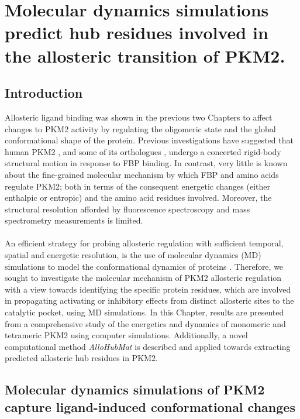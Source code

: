 \chapter{Molecular dynamics simulations predict hub residues involved in the allosteric transition of PKM2.}
\label{chapter:md}

\section{Introduction}
%
%
Allosteric ligand binding was shown in the previous two Chapters to affect changes to PKM2 activity by regulating the oligomeric state and the global conformational shape of the protein. Previous investigations have suggested that human PKM2 \cite{Morgan:2013aa}, and some of its orthologues \cite{Morgan:2010aa,Zhong:2017aa,Donovan:2016aa}, undergo a concerted rigid-body structural motion in response to FBP binding. In contrast, very little is known about the fine-grained molecular mechanism by which FBP and amino acids regulate PKM2; both in terms of the consequent energetic changes (either enthalpic or entropic) and the amino acid residues involved. Moreover, the structural resolution afforded by fluorescence spectroscopy and mass spectrometry measurements is limited. 
%
%
\\\\
%
%
An efficient strategy for probing allosteric regulation with sufficient temporal, spatial and energetic resolution, is the use of molecular dynamics (MD) simulations to model the conformational dynamics of proteins \cite{Durrant:2011aa,Guo:2016aa,Macpherson:2017aa}. Therefore, we sought to investigate the molecular mechanism of PKM2 allosteric regulation with a view towards identifying the specific protein residues, which are involved in propagating activating or inhibitory effects from distinct allosteric sites to the catalytic pocket, using MD simulations. In this Chapter, results are presented from a comprehensive study of the energetics and dynamics of monomeric and tetrameric PKM2 using computer simulations. Additionally, a novel computational method \textit{AlloHubMat} is described and applied towards extracting predicted allosteric hub residues in PKM2.

\clearpage


\section{Molecular dynamics simulations of PKM2 capture ligand-induced conformational changes}

